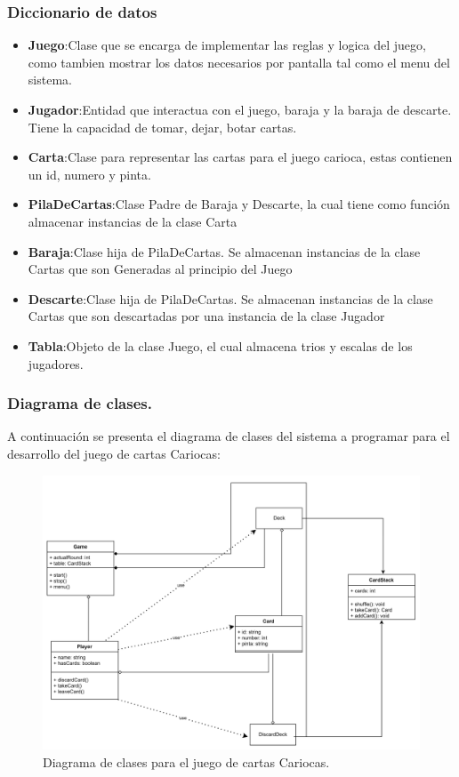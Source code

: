 \documentclass[60pt]{article}
\begin{document}
\subsubsection{Diccionario de datos}\label{cap:diccionario-datos}
\begin{itemize}
    \item\textbf{Juego}:Clase que se encarga de implementar las reglas y logica del juego, \\como tambien mostrar los datos necesarios por pantalla tal como el menu del sistema.
    \item\textbf{Jugador}:Entidad que interactua con el juego, baraja y la baraja de descarte. Tiene la capacidad de tomar, dejar, botar cartas.
    \item\textbf{Carta}:Clase para representar las cartas para el juego carioca, estas contienen un id, numero y pinta.
    \item\textbf{PilaDeCartas}:Clase Padre de Baraja y Descarte, la cual tiene como función almacenar instancias de la clase Carta
    \item\textbf{Baraja}:Clase hija de PilaDeCartas. Se almacenan instancias de la clase Cartas que son Generadas al principio del Juego
    \item\textbf{Descarte}:Clase hija de PilaDeCartas. Se almacenan instancias de la clase Cartas que son descartadas por una instancia de la clase Jugador
    \item\textbf{Tabla}:Objeto de la clase Juego, el cual almacena trios y escalas de los jugadores.
\end{itemize}
\clearpage
\subsubsection{Diagrama de clases.}\label{cap:diagrama-clases}
A continuación se presenta el diagrama de clases del sistema a programar para el desarrollo del juego de cartas Cariocas:
\begin{figure}[H]
    \centering
    \includegraphics[width=15cm]{diclass.png}
    \caption{Diagrama de clases para el juego de cartas Cariocas.}
\end{figure}
\end{document}
